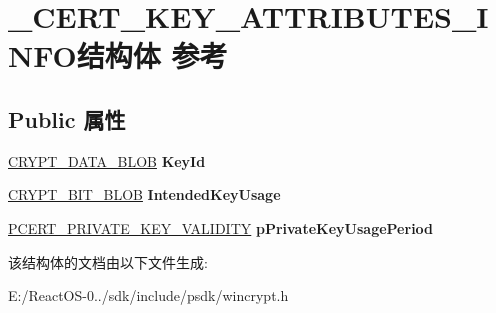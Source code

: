 \hypertarget{struct___c_e_r_t___k_e_y___a_t_t_r_i_b_u_t_e_s___i_n_f_o}{}\section{\+\_\+\+C\+E\+R\+T\+\_\+\+K\+E\+Y\+\_\+\+A\+T\+T\+R\+I\+B\+U\+T\+E\+S\+\_\+\+I\+N\+F\+O结构体 参考}
\label{struct___c_e_r_t___k_e_y___a_t_t_r_i_b_u_t_e_s___i_n_f_o}
\subsection*{Public 属性}
\begin{DoxyCompactItemize}
\item 
\mbox{\label{struct___c_e_r_t___k_e_y___a_t_t_r_i_b_u_t_e_s___i_n_f_o_a50e1bb1088581a37927137ee259207aa}} 
\hyperlink{struct___c_r_y_p_t_o_a_p_i___b_l_o_b}{C\+R\+Y\+P\+T\+\_\+\+D\+A\+T\+A\+\_\+\+B\+L\+OB} {\bfseries Key\+Id}
\item 
\mbox{\label{struct___c_e_r_t___k_e_y___a_t_t_r_i_b_u_t_e_s___i_n_f_o_ad61adbf34457a72a7ccb1950eb95ad78}} 
\hyperlink{struct___c_r_y_p_t___b_i_t___b_l_o_b}{C\+R\+Y\+P\+T\+\_\+\+B\+I\+T\+\_\+\+B\+L\+OB} {\bfseries Intended\+Key\+Usage}
\item 
\mbox{\label{struct___c_e_r_t___k_e_y___a_t_t_r_i_b_u_t_e_s___i_n_f_o_a0de25921ece4a069b493bee2437d90e9}} 
\hyperlink{struct___c_e_r_t___p_r_i_v_a_t_e___k_e_y___v_a_l_i_d_i_t_y}{P\+C\+E\+R\+T\+\_\+\+P\+R\+I\+V\+A\+T\+E\+\_\+\+K\+E\+Y\+\_\+\+V\+A\+L\+I\+D\+I\+TY} {\bfseries p\+Private\+Key\+Usage\+Period}
\end{DoxyCompactItemize}


该结构体的文档由以下文件生成\+:\begin{DoxyCompactItemize}
\item 
E\+:/\+React\+O\+S-\/0../sdk/include/psdk/wincrypt.\+h\end{DoxyCompactItemize}
